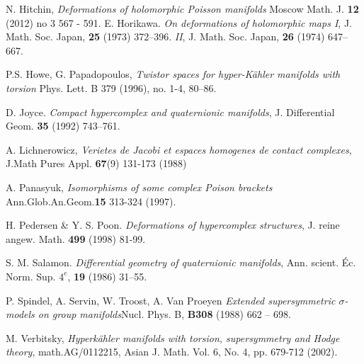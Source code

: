 \documentclass[11pt,oneside,leqno]{amsart}
\theoremstyle{plain}
\theoremstyle{definition}
\begin{document}
\begin{thebibliography}{12}
 N. Hitchin, {\it Deformations of holomorphic Poisson manifolds} Moscow Math. J. {\bf 12} (2012) no 3 567 - 591.
\smallskip
  E. Horikawa.
  {\em On deformations of holomorphic maps I},
  J. Math. Soc. Japan, {\bf 25}
  (1973) 372--396.
  {\em II},
  J. Math. Soc. Japan, {\bf 26}
  (1974) 647--667.

 P.S. Howe, G. Papadopoulos,  {\em Twistor spaces for
  hyper-K\"ahler manifolds with torsion} Phys. Lett. B 379
(1996), no. 1-4, 80--86.
\smallskip

  D. Joyce.
  {\em Compact hypercomplex and quaternionic manifolds},
  J. Differential Geom.
  {\bf 35} (1992) 743--761.
  \smallskip

 A. Lichnerowicz, {\em Verietes de Jacobi et espaces homogenes de contact complexes}, J.Math Pures Appl. {\bf 67}(9) 131-173 (1988)
\smallskip

 A. Panasyuk, {\em Isomorphisms of some complex Poison brackets} Ann.Glob.An.Geom.{\bf 15} 313-324 (1997).
\smallskip

 H. Pedersen \& Y. S. Poon.
  {\em Deformations of hypercomplex structures},
  J. reine angew. Math. {\bf 499}
  (1998) 81-99.
\smallskip

 S. M. Salamon.
  {\em Differential geometry of quaternionic manifolds},
  Ann. scient. \'{E}c. Norm. Sup. $4^e$,
  {\bf 19} (1986) 31--55.
\smallskip

 P. Spindel, A. Servin, W. Troost, A. Van Proeyen {\it Extended supersymmetric $\sigma$-models on group manifolds}Nucl. Phys. B, {\bf B308} (1988) 662 -- 698.
\smallskip

 M. Verbitsky, {\em Hyperk\"ahler manifolds with torsion,
  supersymmetry and Hodge theory}, math.AG/0112215,
Asian J. Math. Vol. 6, No. 4, pp. 679-712 (2002).

\end{thebibliography}
\end{document}
